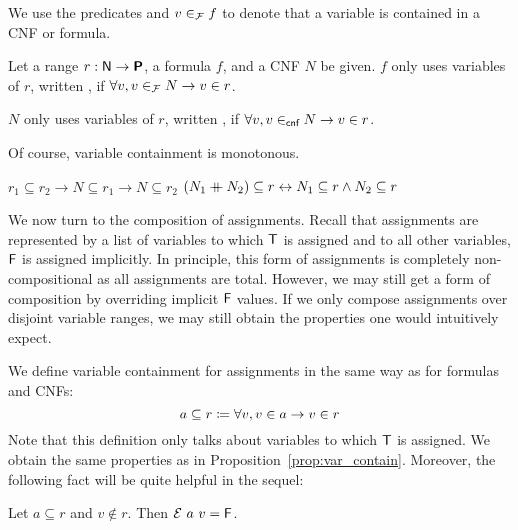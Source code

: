 %
We use the predicates  and $v \in_{\mathcal{F}} f$ to denote that a variable is contained in a CNF or formula.
%

\begin{definition}
  Let a range $r : \mathsf{N} \rightarrow \textsf{\bfseries P}$, a formula $f$, and a CNF $N$ be given. 
  $f$ only uses variables of $r$, written , if $\forall v, v \in_{\mathcal{F}} N \rightarrow v \in r$.


  $N$ only uses variables of $r$, written , if $\forall v, v \in_{\textsf{cnf}} N \rightarrow v \in r$. 
\end{definition}

Of course, variable containment is monotonous. 
\begin{proposition}\label{prop:var_contain}\leavevmode
  \begin{enumerate}
     $r_1 \subseteq r_2 \rightarrow N \subseteq r_1 \rightarrow N \subseteq r_2$
     $(N_1 \mathbin{+\mkern-10mu+} N_2) \subseteq r \leftrightarrow N_1 \subseteq r \land N_2 \subseteq r$
  \end{enumerate}
\end{proposition}

We now turn to the composition of assignments. Recall that assignments are represented by a list of variables to which $\mathsf{T}$ is assigned and to all other variables, $\mathsf{F}$ is assigned implicitly. 
In principle, this form of assignments is completely non-compositional as all assignments are total. 
However, we may still get a form of composition by overriding implicit $\mathsf{F}$ values. If we only compose assignments over disjoint variable ranges, we may still obtain the properties one would intuitively expect. 

We define variable containment  for assignments in the same way as for formulas and CNFs:
\[a \subseteq r \coloneqq \forall v, v \in a \rightarrow v \in r \]
Note that this definition only talks about variables to which $\mathsf{T}$ is assigned.
We obtain the same properties as in Proposition~\ref{prop:var_contain}.
Moreover, the following fact will be quite helpful in the sequel:
\begin{fact}
  Let $a \subseteq r$ and $v \notin r$. Then $\mathcal{E}~a~v = \mathsf{F}$.
\end{fact}

